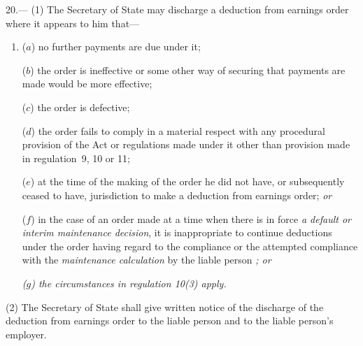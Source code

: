 \documentclass[12pt,a4paper]{article}
\begin{document}
20.—%
%
%
(1) The Secretary of State may discharge a deduction from earnings order where it appears to him that—
\begin{enumerate}\item[]
($a$) no further payments are due under it;

($b$) the order is ineffective or some other way of securing that payments are made would be more effective;

($c$) the order is defective;

($d$) the order fails to comply in a material respect with any procedural provision of the Act or regulations made under it other than provision made in regulation~9, 10 or 11;

($e$) at the time of the making of the order he did not have, or subsequently ceased to have, jurisdiction to make a deduction from earnings order; 
\emph{or}  %

($f$) in the case of an order made at a time when there is in force 
\emph{a default or interim maintenance decision},  %
it is inappropriate to continue deductions under the order having regard to the compliance or the attempted compliance with the 
\emph{maintenance calculation}  %
by the liable person%
\emph{%
; or
}

\emph{
($g$) the circumstances in regulation 10(3) apply.
}
\end{enumerate}

(2) The Secretary of State shall give written notice of the discharge of the deduction from earnings order to the liable person and to the liable person’s employer.
\end{document}
